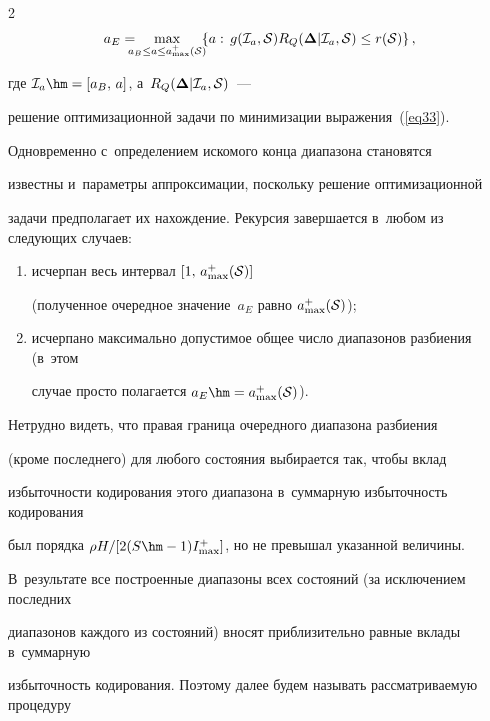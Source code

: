 \begin{multicols}{2}
$$

a_E = \hspace*{-8pt}\max\limits_{a_B\le a\le a_{\max}^+({\cal S})}\hspace*{-5pt}

\left\{ a:\, g({\cal I}_a,{\cal S})

R_Q(\boldsymbol{\Delta}|{\cal I}_a,{\cal S}) \le r({\cal S})\right\},

$$

где ${\cal I}_a\hm= [a_B,\,a]$, а~$R_Q(\boldsymbol{\Delta}|{\cal I}_a,{\cal S})$~--- 

решение оптимизационной задачи по минимизации выражения~(\ref{eq33}). 

Одновременно с~определением искомого конца диапазона становятся 

известны и~параметры аппроксимации, поскольку решение оптимизационной 

задачи предполагает их нахождение. Рекурсия завершается в~любом из следующих случаев:

\begin{enumerate}[(1)]

\item исчерпан весь интервал $[1,\,a_{\max}^+({\cal S})]$ 

(полученное очередное  значение~$a_E$ равно $a_{\max}^+({\cal S})$);

\item исчерпано максимально допустимое общее чис\-ло диапазонов разбиения (в~этом 

случае просто полагается $a_E\hm= a_{\max}^+({\cal S})$).

\end{enumerate}



Нетрудно видеть, что правая граница очередного диапазона разбиения 

(кроме последнего) для любого состояния выбирается так, чтобы вклад 

избыточности кодирования этого диапазона в~суммарную избыточность кодирования 

был порядка $\rho H/[2( S\hm-1) I_{\max}^+]$, но не превышал указанной величины. 

В~результате все построенные диапазоны всех состояний (за исключением последних 

диапазонов каждого из состояний) вносят приблизительно равные вклады в~суммарную 

избыточность кодирования. Поэтому далее будем называть рассматриваемую процедуру 


\end{multicols}
